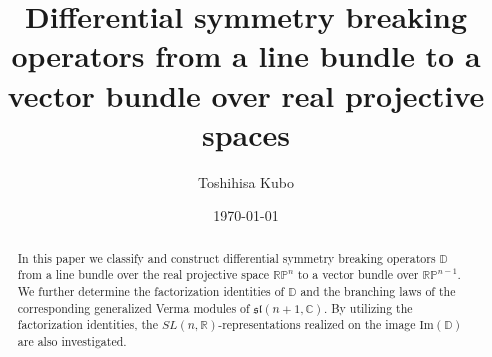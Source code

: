 \documentclass[reqno,11pt]{amsart}
\theoremstyle{remark}
\theoremstyle{definition}
\numberwithin{equation}{section}
\newcommand{\f}{\mathfrak}
\newcommand{\R}{\mathbb{R}}
\newcommand{\C}{\mathbb{C}}
\renewcommand{\Im}{\mathrm{Im}}
\newcommand{\RP}{\mathbb{R}\mathbb{P}}
\newcommand{\bD}{\mathbb{D}}
\begin{document}
\baselineskip=16pt
\tabulinesep=1.2mm


\title[]{
Differential symmetry breaking operators from a line bundle to a vector bundle
over real projective spaces
}



\author{Toshihisa Kubo}

\address{Faculty of Economics, 
Ryukoku University,
67 Tsukamoto-cho, Fukakusa, Fushimi-ku, Kyoto 612-8577, Japan}



\date{\today}

\maketitle


\begin{abstract} 
In this paper we classify and construct differential symmetry breaking operators $\bD$ from a line bundle over the real projective space $\RP^n$ to a vector bundle
over $\RP^{n-1}$. We further determine the factorization identities of  
$\bD$ and the branching laws of the corresponding generalized Verma modules
of $\f{sl}(n+1,\C)$.
By utilizing the factorization identities, 
the $SL(n,\R)$-representations realized on the image $\Im(\bD)$ 
are also investigated.
\end{abstract}
\end{document}

